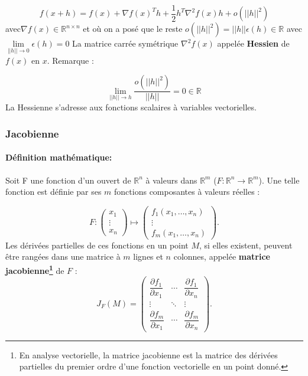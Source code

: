 	\begin{equation}
	f(x + h) = f(x)+\nabla f(x)^Th + \frac{1}{2}h^T\nabla^2f(x)h+o(||h||^2)
	\end{equation}
	avec$\nabla f(x)\in \mathbb{R}^{n\times n}$ et où on a posé que le reste
	$ o(||h||^2) =||h|| \epsilon(h) \in \mathbb{R} $ avec
	$\lim\limits_{||h|| \to 0} \epsilon(h) = 0 $
	La matrice carrée symétrique $\nabla^2 f(x)$ appelée \textbf{Hessien} de $f(x)$ en $x$. Remarque :
	
	$$
	\lim\limits_{||h|| \to h} \frac{o(||h||^2)}{||h||} = 0  \in \mathbb{R}
	$$
	La Hessienne s’adresse aux fonctions scalaires à variables vectorielles.
	
	\subsubsection{Jacobienne}
	\paragraph*{Définition mathématique:}
	Soit F une fonction d'un ouvert de $\mathbb{R}^{n}$ à valeurs dans $\mathbb{R}^{m}$ ($F:\mathbb{R}^{n}\to \mathbb {R}^{m}$). Une telle fonction est définie par ses $m$ fonctions composantes à valeurs réelles :
	
	$$
	{ F:
	{\begin{pmatrix}
	x_{1}\\\vdots \\
	x_{n}
	\end{pmatrix}}
	\longmapsto
	{\begin{pmatrix}
	f_{1}(x_{1},\dots ,x_{n})\\
	\vdots \\f_{m}(x_{1},\dots ,x_{n})
	\end{pmatrix}}}.
	$$
	Les dérivées partielles de ces fonctions en un point $M$, si elles existent, peuvent être rangées dans une matrice à $m$ lignes et $n$ colonnes, appelée \textbf{matrice jacobienne\footnote{En analyse vectorielle, la matrice jacobienne est la matrice des dérivées partielles du premier ordre d'une fonction vectorielle en un point donné.}} de $F$ :
	$$
	J_{F}\left(M\right)={
	\begin{pmatrix}
	{\dfrac {\partial f_{1}}{\partial x_{1}}}&\cdots &{\dfrac {\partial f_{1}}{\partial x_{n}}}\\
	\vdots &\ddots &\vdots \\
	{\dfrac {\partial f_{m}}{\partial x_{1}}}&\cdots &{\dfrac {\partial f_{m}}{\partial x_{n}}}
	\end{pmatrix}}.
	$$
	
